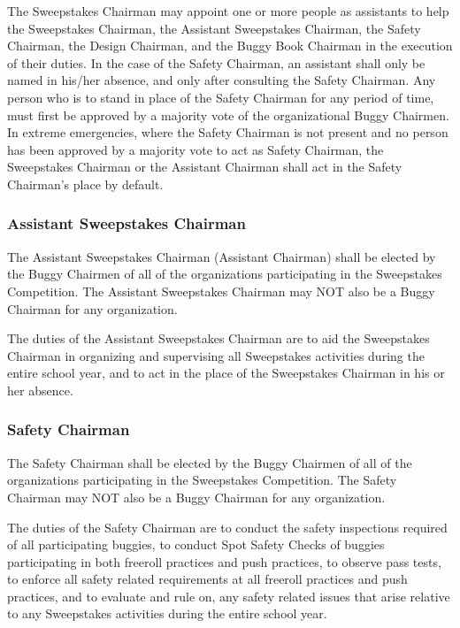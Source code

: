 	The Sweepstakes Chairman may appoint one or more people as assistants to help
	the Sweepstakes Chairman, the Assistant Sweepstakes Chairman, the Safety
	Chairman, the Design Chairman, and the Buggy Book Chairman in the execution of
	their duties. In the case of the Safety Chairman, an assistant shall only be
	named in his/her absence, and only after consulting the Safety Chairman. Any
	person who is to stand in place of the Safety Chairman for any period of time,
	must first be approved by a majority vote of the organizational Buggy Chairmen.
	In extreme emergencies, where the Safety Chairman is not present and no person
	has been approved by a majority vote to act as Safety Chairman, the Sweepstakes
	Chairman or the Assistant Chairman shall act in the Safety Chairman's place by
	default.

\subsubsection{Assistant Sweepstakes Chairman}

	The Assistant Sweepstakes Chairman (Assistant Chairman) shall be elected by the
	Buggy Chairmen of all of the organizations participating in the Sweepstakes
	Competition. The Assistant Sweepstakes Chairman may NOT also be a Buggy
	Chairman for any organization.

	The duties of the Assistant Sweepstakes Chairman are to aid the Sweepstakes
	Chairman in organizing and supervising all Sweepstakes activities during the
	entire school year, and to act in the place of the Sweepstakes Chairman in his
	or her absence.

\subsubsection{Safety Chairman}

	The Safety Chairman shall be elected by the Buggy Chairmen of all of the
	organizations participating in the Sweepstakes Competition. The Safety Chairman
	may NOT also be a Buggy Chairman for any organization.

	The duties of the Safety Chairman are to conduct the safety inspections
	required of all participating buggies, to conduct Spot Safety Checks of buggies
	participating in both freeroll practices and push practices, to observe pass
	tests, to enforce all safety related requirements at all freeroll practices and
	push practices, and to evaluate and rule on, any safety related issues that
	arise relative to any Sweepstakes activities during the entire school year.

